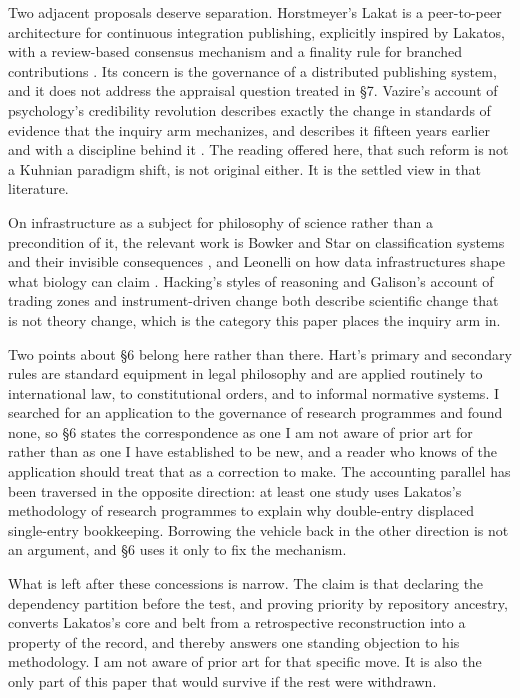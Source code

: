 \documentclass[11pt,letterpaper]{article}
\begin{document}
Two adjacent proposals deserve separation. Horstmeyer's Lakat is a
peer-to-peer architecture for continuous integration publishing, explicitly
inspired by Lakatos, with a review-based consensus mechanism and a finality rule
for branched contributions \citep{horstmeyer2023}. Its concern is the governance
of a distributed publishing system, and it does not address the appraisal
question treated in \S7. Vazire's account of psychology's credibility revolution
describes exactly the change in standards of evidence that the inquiry arm
mechanizes, and describes it fifteen years earlier and with a discipline behind
it \citep{vazire2018}. The reading offered here, that such reform is not a
Kuhnian paradigm shift, is not original either. It is the settled view in that
literature.

On infrastructure as a subject for philosophy of science rather than a
precondition of it, the relevant work is Bowker and Star on classification
systems and their invisible consequences \citep{bowker1999}, and Leonelli on how
data infrastructures shape what biology can claim \citep{leonelli2016}. Hacking's
styles of reasoning \citep{hacking1992} and Galison's account of trading zones
and instrument-driven change \citep{galison1997} both describe scientific change
that is not theory change, which is the category this paper places the inquiry
arm in.

Two points about \S6 belong here rather than there. Hart's primary and secondary
rules are standard equipment in legal philosophy and are applied routinely to
international law, to constitutional orders, and to informal normative systems.
I searched for an application to the governance of research programmes and found
none, so \S6 states the correspondence as one I am not aware of prior art for
rather than as one I have established to be new, and a reader who knows of the
application should treat that as a correction to make. The accounting parallel
has been traversed in the opposite direction: at least one study uses Lakatos's
methodology of research programmes to explain why double-entry displaced
single-entry bookkeeping. Borrowing the vehicle back in the other direction is
not an argument, and \S6 uses it only to fix the mechanism.

What is left after these concessions is narrow. The claim is that declaring the
dependency partition before the test, and proving priority by repository
ancestry, converts Lakatos's core and belt from a retrospective reconstruction
into a property of the record, and thereby answers one standing objection to his
methodology. I am not aware of prior art for that specific move. It is also the
only part of this paper that would survive if the rest were withdrawn.
\end{document}
